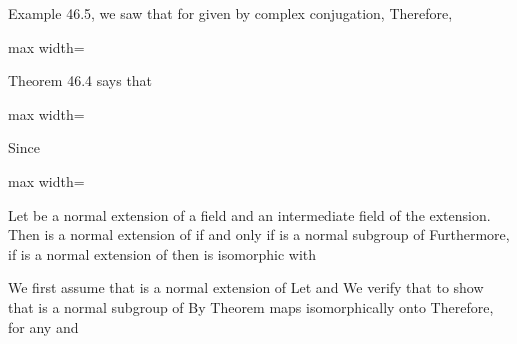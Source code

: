 \documentclass[11pt,oneside]{article}
\begin{document}
\BookNarrativetrue

\begin{BookBody}

Example 46.5, we saw that for  given by complex conjugation,   Therefore,

\begin{center}\begin{adjustbox}{max width=\linewidth}\end{adjustbox}\end{center}

Theorem 46.4 says that

\begin{center}\begin{adjustbox}{max width=\linewidth}\end{adjustbox}\end{center}

\noindent Since 

\begin{center}\begin{adjustbox}{max width=\linewidth}\end{adjustbox}\end{center} \BookEnd{\blacktriangle}

 Let  be a normal extension of a field  and  an intermediate field of the extension. Then  is a normal extension of  if and only if  is a normal subgroup of  Furthermore, if  is a normal extension of  then  is isomorphic with 

 We first assume that  is a normal extension of  Let  and \BookInline{\sigma \in }  We verify that  to show that  is a normal subgroup of  By Theorem  maps  isomorphically onto  Therefore, for any  and


\end{BookBody}
\end{document}
